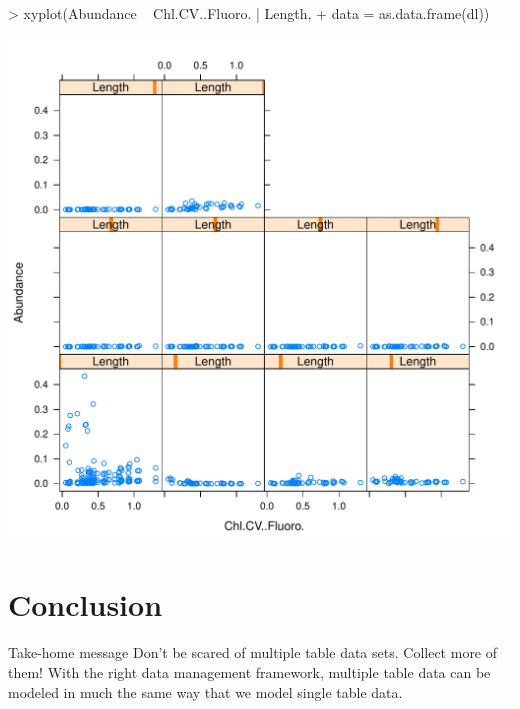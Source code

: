 \documentclass{beamer}
\numberwithin{exercise}{section}
\begin{document}
\begin{frame}[fragile]
\begin{Schunk}
\begin{Sinput}
> xyplot(Abundance ~ Chl.CV..Fluoro. | Length, 
+ data = as.data.frame(dl))
\end{Sinput}
\end{Schunk}
\includegraphics{sweave-026}
\end{frame}

\section{Conclusion}
\frame{\tableofcontents[currentsection]}

\begin{frame}
\begin{center}
\begin{block}{Take-home message}
Don't be scared of multiple table data sets.  \pause Collect more of them! \pause With the right data management framework, \pause multiple table data can be modeled in much the same way that we model single table data.
\end{block}
\end{center}
\end{frame}
\end{document}
